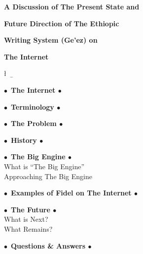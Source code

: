 \thispagestyle{empty}
\centerline{\LARGE\bf A Discussion of The Present State and}
\vspace{0.02in}
\centerline{\LARGE\bf Future Direction of The Ethiopic}
\centerline{\LARGE\bf Writing System (Ge'ez) on}
\centerline{\LARGE\bf The Internet} 
\vspace{0.1in}
\centerline{\da\n\E\l \ \ya\II\qo\b \ \me\kWe\n\n} 
\vspace{0.05in}
\centerline{}

\vspace{0.4in}

\begin{center}
  {\large$\bullet$\ \bf{The Internet} $\bullet$} \\
\vspace{0.2in}

  {\large $\bullet$\ \bf{Terminology} $\bullet$} \\
\vspace{0.2in}

  {\large $\bullet$\ \bf{The Problem} $\bullet$} \\
\vspace{0.2in}

  {\large $\bullet$\ \bf{History} $\bullet$} \\
\vspace{0.2in}

  {\large $\bullet$\ \bf{The Big Engine} $\bullet$} \\
    What is ``The Big Engine'' \\
    Approaching The Big Engine
\vspace{0.2in}

  {\large $\bullet$\ \bf{Examples of Fidel on The Internet} $\bullet$} \\
\vspace{0.2in}

  {\large $\bullet$\ \bf{The Future} $\bullet$} \\
    What is Next? \\
    What Remains? \\
\vspace{0.2in}

  {\large $\bullet$\ \bf{Questions \& Answers} $\bullet$}
\end{center}

